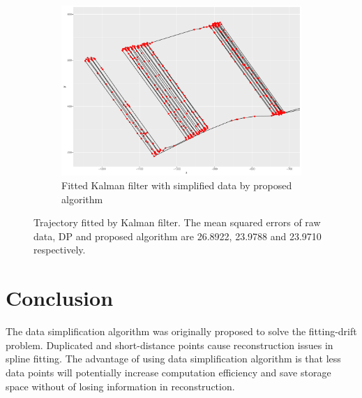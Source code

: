 \begin{figure}
\begin{subfigure}[t]{0.47\textwidth}
\includegraphics[width=\linewidth]{Chapters/06Spinoff/plot/ggSPKF2.pdf}
\caption{Fitted Kalman filter with simplified data by proposed algorithm}
\end{subfigure}
\caption{Trajectory fitted by Kalman filter. The mean squared errors of raw data, DP and proposed algorithm are 26.8922, 23.9788 and 23.9710 respectively.}\label{DataSimpKFTra}
\end{figure}

\pagebreak

\section{Conclusion}

The data simplification algorithm was originally proposed to solve the fitting-drift problem. Duplicated and short-distance points cause reconstruction issues in spline fitting. The advantage of using data simplification algorithm is that less data points will potentially increase computation efficiency and save storage space without of losing information in reconstruction.  
